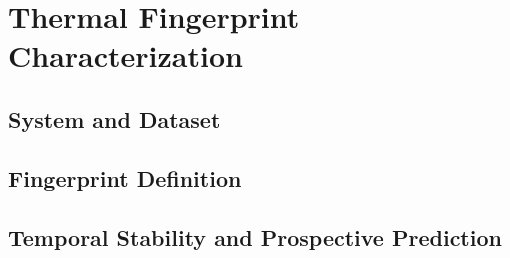 
\section{Thermal Fingerprint Characterization}
\label{sec:fingerprints}

\subsection{System and Dataset}

\subsection{Fingerprint Definition}

\subsection{Temporal Stability and Prospective Prediction}

